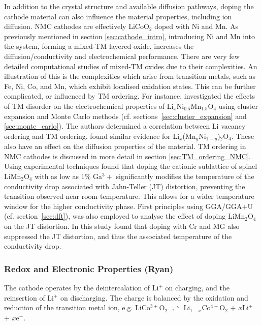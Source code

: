 \documentclass[../main.tex]{subfiles}
\begin{document}
In addition to the crystal structure and available diffusion pathways, doping the cathode material can also influence the material properties, including ion diffusion. NMC cathodes are effectively LiCoO$_2$ doped with Ni and Mn. As previously mentioned in section \ref{sec:cathode_intro}, introducing Ni and Mn into the system, forming a mixed-TM layered oxide, increases the diffusion/conductivity and electrochemical performance. There are very few detailed computational studies of mixed-TM oxides due to their complexities. An illustration of this is the complexities which arise from transition metals, such as Fe, Ni, Co, and Mn, which exhibit localised oxidation states. This can be further complicated, or influenced by TM ordering. For instance, \citeauthor{lee2013solid} investigated the effects of TM disorder on the electrochemical properties of Li$_x$Ni$_{0.5}$Mn$_{1.5}$O$_4$ using cluster expansion and Monte Carlo methods (cf. sections~\ref{sec:cluster_expansion} and \ref{sec:monte_carlo}). The authors determined a correlation between Li vacancy ordering and TM ordering. \cite{lee2013solid} \citeauthor{hao2016quaternary} found similar evidence for Li$_x$(Mn$_y$Ni$_{1-y}$)$_2$O$_4$. \cite{hao2016quaternary} These also have an effect on the diffusion properties of the material. TM ordering in NMC cathodes is discussed in more detail in section \ref{sec:TM_ordering_NMC}. Using experimental techniques \citeauthor{capsoni2002inhibition} found that doping the cationic sublattice of spinel LiMn$_2$O$_4$ with as low as 1\% Ga${^3+}$ significantly modifies the temperature of the conductivity drop associated with Jahn-Teller (JT) distortion, preventing the transition observed near room temperature. \cite{capsoni2002inhibition} This allows for a wider temperature window for the higher conductivity phase. First principles using GGA/GGA+U (cf. section~\ref{sec:dft}), was also employed to analyse the effect of doping LiMn$_2$O$_4$ on the JT distortion. In this study \citeauthor{singh2009suppression} found that doping with Cr and MG also suppressed the JT distortion, and thus the associated temperature of the conductivity drop. \cite{singh2009suppression} 

\subsubsection{Redox and Electronic Properties (Ryan)}
The cathode operates by the deintercalation of Li$^+$ on charging, and the reinsertion of Li$^+$ on discharging. The charge is balanced by the oxidation and reduction of the transition metal ion, e.g. LiCo$^{3+}$O$_2$ $\rightleftharpoons$ Li$_{1-x}$Co$^{4+}$O$_2$ + $x$Li$^+$ + $x$e$^-$. 
\end{document}
